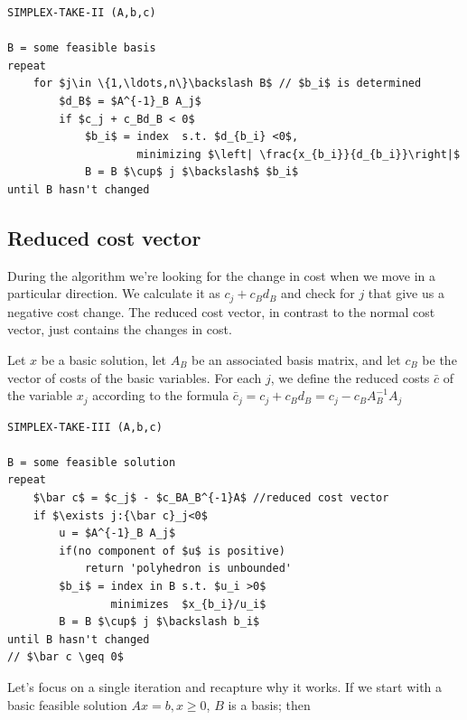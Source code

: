 \begin{center}
\begin{lstlisting}
SIMPLEX-TAKE-II (A,b,c)

B = some feasible basis
repeat 
    for $j\in \{1,\ldots,n\}\backslash B$ // $b_i$ is determined
        $d_B$ = $A^{-1}_B A_j$
        if $c_j + c_Bd_B < 0$
            $b_i$ = index  s.t. $d_{b_i} <0$, 
                    minimizing $\left| \frac{x_{b_i}}{d_{b_i}}\right|$
            B = B $\cup$ j $\backslash$ $b_i$
until B hasn't changed
\end{lstlisting}
\end{center}

\subsection{Reduced cost vector}
During the algorithm we're looking for the change in cost when we move in a particular direction. We calculate it as $c_j+c_Bd_B$ and check for $j$ that give us a negative cost change. The reduced cost vector, in contrast to the normal cost vector, just contains the changes in cost.

\begin{Def}
 Let $x$ be a basic solution, let $A_B$ be an associated basis matrix, and let $c_B$ be the vector of costs of the basic variables. For each $j$, we define the reduced costs $\bar c$ of the variable $x_j$ according to the formula 
$\bar c_j = c_j + c_Bd_B = c_j - c_B A^{-1}_B A_j$
\end{Def}


\begin{center}
\begin{lstlisting}
SIMPLEX-TAKE-III (A,b,c)

B = some feasible solution
repeat
    $\bar c$ = $c_j$ - $c_BA_B^{-1}A$ //reduced cost vector
    if $\exists j:{\bar c}_j<0$ 
        u = $A^{-1}_B A_j$ 
        if(no component of $u$ is positive)
            return 'polyhedron is unbounded'
        $b_i$ = index in B s.t. $u_i >0$ 
                minimizes  $x_{b_i}/u_i$
        B = B $\cup$ j $\backslash b_i$ 
until B hasn't changed 
// $\bar c \geq 0$ 
\end{lstlisting}
\end{center}


Let's focus on a single iteration and recapture why it works. If we start with a basic feasible solution $Ax=b, x\geq 0$, $B$ is a basis; then 

